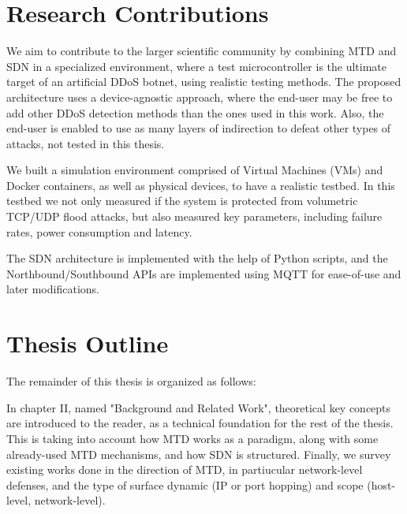 \section{Research Contributions}

We aim to contribute to the larger scientific community by combining MTD and SDN in a specialized environment, where a test microcontroller is the ultimate target of an artificial DDoS botnet, using realistic testing methods. The proposed architecture uses a device-agnostic approach, where the end-user may be free to add other DDoS detection methods than the ones used in this work. Also, the end-user is enabled to use as many layers of indirection to defeat other types of attacks, not tested in this thesis.

We built a simulation environment comprised of Virtual Machines (VMs) and Docker containers, as well as physical devices, to have a realistic testbed. In this testbed we not only measured if the system is protected from volumetric TCP/UDP flood attacks, but also measured key parameters, including failure rates, power consumption and latency.

The SDN architecture is implemented with the help of Python scripts, and the Northbound/Southbound APIs are implemented using MQTT for ease-of-use and later modifications.

\section{Thesis Outline}
The remainder of this thesis is organized as follows: 

In chapter II, named "Background and Related Work", theoretical key concepts are introduced to the reader, as a technical foundation for the rest of the thesis. This is taking into account how MTD works as a paradigm, along with some already-used MTD mechanisms, and how SDN is structured. Finally, we survey existing works done in the direction of MTD, in partiucular network-level defenses, and the type of surface dynamic (IP or port hopping) and scope (host-level, network-level).

